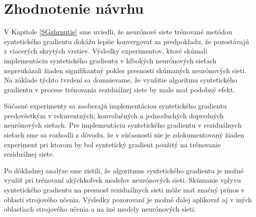 \section{Zhodnotenie návrhu}

V Kapitole \ref{SGzhrnutie} sme uviedli, že neurónové siete trénované  metódou syntetického gradientu dokážu lepšie konvergovať za predpokladu, že pozostávajú z viacerých skrytých vrstiev. Výsledky experimentov, ktoré skúmali implementáciu syntetického gradientu v hlbokých neurónových sieťach nepreukázali žiaden signifikantný pokles presnosti skúmaných neurónových sieti. Na základe týchto tvrdení sa domnievame, že využitie algoritmu syntetického gradientu v procese trénovania reziduálnej siete by malo mať podobný efekt. 

Súčasné experimenty sa zaoberajú implementáciou syntetického gradientu predovšetkým v rekurentných, konvolučných a jednoduchých dopredných neurónových sieťach. Pre implementáciu syntetického gradientu v reziduálnych sieťach sme sa rozhodli z dôvodu, že v súčasnosti nie je zdokumentovaný žiaden experiment pri ktorom by bol syntetický gradient použitý na trénovanie reziduálnej siete. 

Po dôkladnej analýze sme zistili, že algoritmus syntetického gradientu je možné využiť pri trénovaní akýchkoľvek modelov neurónových sieti. Skúmanie vplyvu syntetického gradientu na presnosť reziduálnych sieti môže mať značný prínos v oblasti strojového učenia. Výsledky pozorovaní je možné ďalej aplikovať aj v iných oblastiach strojového učenia a na iné modely neurónových sieti.